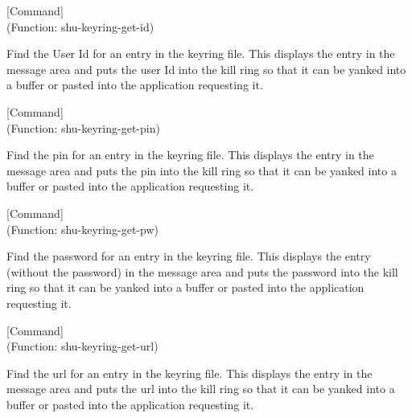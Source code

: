 \vspace{1em}
\noindent
{}
\usebox{\funcname}
 \hfill [Command]\\%
 (Function: shu-keyring-get-id)

\begin{doc-string}
Find the User Id for an entry in the keyring file.  This displays the entry
in the message area and puts the user Id into the kill ring so that it can be
yanked into a buffer or pasted into the application requesting it.
\end{doc-string}

\vspace{1em}
\noindent
{}
\usebox{\funcname}
 \hfill [Command]\\%
 (Function: shu-keyring-get-pin)

\begin{doc-string}
Find the pin for an entry in the keyring file.  This displays the entry in
the message area and puts the pin into the kill ring so that it can be yanked
into a buffer or pasted into the application requesting it.
\end{doc-string}

\vspace{1em}
\noindent
{}
\usebox{\funcname}
 \hfill [Command]\\%
 (Function: shu-keyring-get-pw)

\begin{doc-string}
Find the password for an entry in the keyring file.  This displays the entry
(without the password) in the message area and puts the password into the kill
ring so that it can be yanked into a buffer or pasted into the application
requesting it.
\end{doc-string}

\vspace{1em}
\noindent
{}
\usebox{\funcname}
 \hfill [Command]\\%
 (Function: shu-keyring-get-url)

\begin{doc-string}
Find the url for an entry in the keyring file.  This displays the entry in
the message area and puts the url into the kill ring so that it can be yanked
into a buffer or pasted into the application requesting it.
\end{doc-string}

